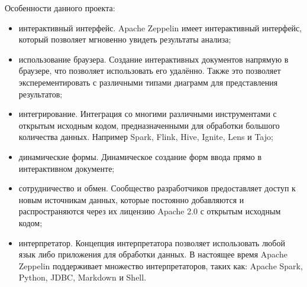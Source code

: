 Особенности данного проекта:
\begin{itemize}
    \item интерактивный интерфейс. Apache Zeppelin имеет интерактивный интерфейс, который позволяет мгновенно увидеть результаты анализа;
    \item использование браузера. Создание интерактивных документов напрямую в браузере, что позволяет использовать его удалённо. Также это позволяет эксперементировать с различными типами диаграмм для представления результатов;
	\item интегрирование. Интеграция со многими различными инструментами с открытым исходным кодом, предназначенными для обработки большого количества данных. Например Spark, Flink, Hive, Ignite, Lens и Tajo;
	\item динамические формы. Динамическое создание форм ввода прямо в интерактивном документе;
    \item сотрудничество и обмен. Сообщество разработчиков предоставляет доступ к новым источникам данных, которые постоянно добавляются и распространяются через их лицензию Apache 2.0 с открытым исходным кодом;
    \item интерпретатор. Концепция интерпретатора позволяет использовать любой язык либо приложения для обработки данных. В настоящее время Apache Zeppelin поддерживает множество интерпретаторов, таких как: Apache Spark, Python, JDBC, Markdown и Shell.
\end{itemize}
